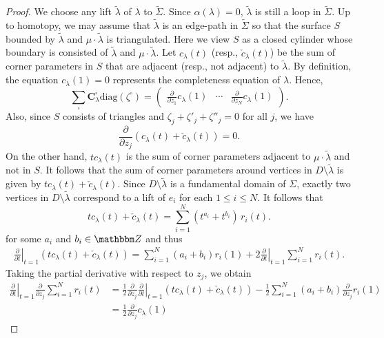 \documentclass[12pt,reqno]{amsart}
\theoremstyle{definition}
\def\BZ{\mathbbm Z}
\def\ti{\widetilde}
\def\be{\begin{equation}}
\def\ee{\end{equation}}
\def\diag{\mathrm{diag}}
\begin{document}
\begin{proof}
We choose any lift $\ti \lambda$ of $\lambda$ to $\ti \Sigma$.
Since $\alpha(\lambda)=0$, $\ti \lambda$ is still a loop in $\ti \Sigma$.
Up to homotopy, we may assume that $\ti \lambda$ is an edge-path in $\ti \Sigma$
so that the surface $S$ bounded by $\ti \lambda$ and $\mu \cdot \ti \lambda$ is
triangulated. Here we view $S$ as a closed cylinder whose boundary is consisted of
$\ti \lambda$ and $\mu\cdot \ti \lambda$. Let $c_\lambda(t)$ (resp.,
$\check{c}_\lambda(t)$) be the sum of corner parameters in $S$ that are adjacent
(resp., not adjacent) to $\ti \lambda$. By definition, the equation $c_\lambda(1)=0$
represents the completeness equation of $\lambda$. Hence, 
\be
\label{eqn.lambda}
\sum_\square \mathbf{C}_\lambda^\square  \diag(\zeta^\square) = 
\begin{pmatrix}
  \frac{\partial}{\partial z_1} c_\lambda(1) & \cdots &
  \frac{\partial}{\partial z_N} c_\lambda(1)
\end{pmatrix}  .
\ee
Also, since $S$ consists of triangles and $\zeta_j + \zeta'_j +\zeta''_j=0$ for
all $j$, we have
\be
\label{eqn:ab}
\frac{\partial}{\partial z_j} (c_\lambda(t)+\check{c}_\lambda(t))=0  .
\ee
On the other hand, $t c_\lambda(t)$ is the sum of corner parameters  adjacent to
$\mu \cdot \ti \lambda$ and not in $S$. It follows that the sum of corner parameters
around vertices in $D \setminus \ti \lambda$ is given by
$tc_\lambda(t)+\check{c}_\lambda(t)$. Since $D \setminus \ti \lambda$ is a fundamental
domain of  $\Sigma$, exactly two vertices in $D \setminus \ti \lambda$  correspond
to a lift of $e_i$ for each $1 \leq i \leq N$. It follows that
\be 
t c_\lambda(t)+\check{c}_\lambda(t)= \sum_{i=1}^N (t^{a_i}+t^{b_i}) \, r_i(t)  .
\ee 	
for some $a_i$ and $b_i \in \BZ$ and thus
\begin{align}
  \left. \frac{\partial}{\partial t} \right|_{t=1}
  (t c_\lambda(t)+\check{c}_\lambda(t)) = \sum_{i=1}^N	(a_i+b_i) r_i(1) +2 \left.
    \frac{\partial}{\partial t} \right|_{t=1} \sum_{i=1}^Nr_i(t)  .
\end{align} 	
Taking the partial derivative with respect to $z_j$, we obtain
\begin{align}
  \left. \frac{\partial}{\partial t} \right|_{t=1} \frac{\partial}{\partial z_j}
  \sum_{i=1}^Nr_i(t) &= \frac{1}{2} \frac{\partial}{\partial z_j} \left.
    \frac{\partial}{\partial t} \right|_{t=1}
  (t c_\lambda(t)+\check{c}_\lambda(t))
  - \frac{1}{2} \sum_{i=1}^N (a_i+b_i) \frac{\partial}{\partial z_j}r_i(1)
  \\
  &=\frac{1}{2} \frac{\partial}{\partial z_j} c_\lambda(1)

\end{align}
\end{proof}
\end{document}
